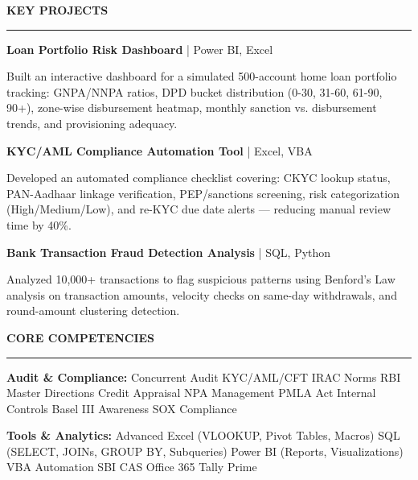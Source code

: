 \documentclass[a4paper,11pt]{article}
\begin{document}
\newpage
{\large \textbf{\textcolor{sectioncolor}{KEY PROJECTS}}}

\vspace{2pt}
\noindent\rule{\textwidth}{1pt}

\vspace{6pt}
\noindent\textbf{Loan Portfolio Risk Dashboard} | Power BI, Excel

\noindent Built an interactive dashboard for a simulated 500-account home loan portfolio tracking: GNPA/NNPA ratios, DPD bucket distribution (0-30, 31-60, 61-90, 90+), zone-wise disbursement heatmap, monthly sanction vs. disbursement trends, and provisioning adequacy.

\vspace{6pt}
\noindent\textbf{KYC/AML Compliance Automation Tool} | Excel, VBA

\noindent Developed an automated compliance checklist covering: CKYC lookup status, PAN-Aadhaar linkage verification, PEP/sanctions screening, risk categorization (High/Medium/Low), and re-KYC due date alerts — reducing manual review time by 40\%.

\vspace{6pt}
\noindent\textbf{Bank Transaction Fraud Detection Analysis} | SQL, Python

\noindent Analyzed 10,000+ transactions to flag suspicious patterns using Benford's Law analysis on transaction amounts, velocity checks on same-day withdrawals, and round-amount clustering detection.

\vspace{12pt}
{\large \textbf{\textcolor{sectioncolor}{CORE COMPETENCIES}}}

\vspace{2pt}
\noindent\rule{\textwidth}{1pt}

\vspace{6pt}
\noindent\textbf{Audit \& Compliance:} Concurrent Audit \textbullet{} KYC/AML/CFT \textbullet{} IRAC Norms \textbullet{} RBI Master Directions \textbullet{} Credit Appraisal \textbullet{} NPA Management \textbullet{} PMLA Act \textbullet{} Internal Controls \textbullet{} Basel III Awareness \textbullet{} SOX Compliance

\vspace{3pt}
\noindent\textbf{Tools \& Analytics:} Advanced Excel (VLOOKUP, Pivot Tables, Macros) \textbullet{} SQL (SELECT, JOINs, GROUP BY, Subqueries) \textbullet{} Power BI (Reports, Visualizations) \textbullet{} VBA Automation \textbullet{} SBI CAS \textbullet{} Office 365 \textbullet{} Tally Prime
\end{document}
